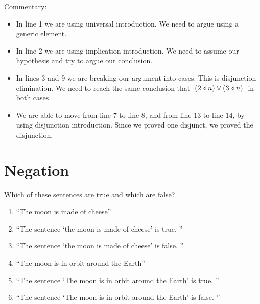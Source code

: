 	Commentary:
	
	\begin{itemize}
			\item In line 1 we are using universal introduction.  We need to argue using a generic element.
			\item In line 2 we are using implication introduction.  We need to assume our hypothesis and try to argue our conclusion.
			\item In lines 3 and 9 we are breaking our argument into cases.  This is disjunction elimination.  We need to reach the same conclusion that  $[(2 \triangleleft n) \vee (3 \triangleleft n)]$ in both cases.
			\item We are able to move from line $7$ to line $8$, and from line $13$ to line $14$, by using disjunction introduction.  Since we proved one disjunct, we proved the disjunction.
		\end{itemize}


\section{Negation}

\begin{xca}
	Which of these sentences are true and which are false?
	
	\begin{enumerate}
			\item ``The moon is made of cheese''
			\item ``The sentence `the moon is made of cheese' is true. ''
			\item ``The sentence `the moon is made of cheese' is false. ''
			\item ``The moon is in orbit around the Earth''
			\item ``The sentence `The moon is in orbit around the Earth' is true. ''
			\item ``The sentence `The moon is in orbit around the Earth' is false. ''
		\end{enumerate}
	\end{xca}

